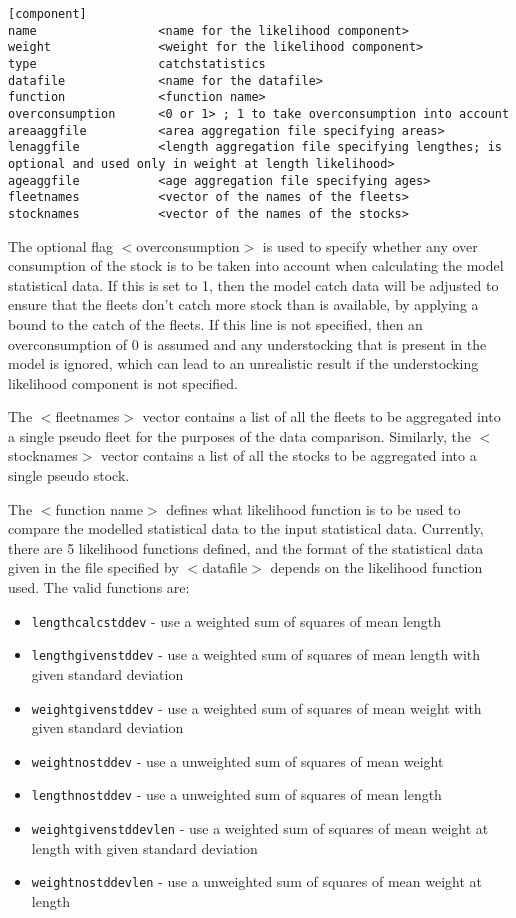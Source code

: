 \documentclass[]{book}
\providecommand{\tightlist}{%
  \setlength{\itemsep}{0pt}\setlength{\parskip}{0pt}}
\begin{document}
\begin{verbatim}
[component]
name                 <name for the likelihood component>
weight               <weight for the likelihood component>
type                 catchstatistics
datafile             <name for the datafile>
function             <function name>
overconsumption      <0 or 1> ; 1 to take overconsumption into account
areaaggfile          <area aggregation file specifying areas>
lenaggfile           <length aggregation file specifying lengthes; is optional and used only in weight at length likelihood>
ageaggfile           <age aggregation file specifying ages>
fleetnames           <vector of the names of the fleets>
stocknames           <vector of the names of the stocks>
\end{verbatim}

The optional flag \(<\)overconsumption\(>\) is used to specify whether any
over consumption of the stock is to be taken into account when
calculating the model statistical data. If this is set to 1, then the
model catch data will be adjusted to ensure that the fleets don't catch
more stock than is available, by applying a bound to the catch of the
fleets. If this line is not specified, then an overconsumption of 0 is
assumed and any understocking that is present in the model is ignored,
which can lead to an unrealistic result if the understocking likelihood
component is not specified.

The \(<\)fleetnames\(>\) vector contains a list of all the fleets to be
aggregated into a single pseudo fleet for the purposes of the data
comparison. Similarly, the \(<\)stocknames\(>\) vector contains a list of
all the stocks to be aggregated into a single pseudo stock.

The \(<\)function name\(>\) defines what likelihood function is to be used
to compare the modelled statistical data to the input statistical data.
Currently, there are 5 likelihood functions defined, and the format of
the statistical data given in the file specified by \(<\)datafile\(>\)
depends on the likelihood function used. The valid functions are:

\begin{itemize}
\tightlist
\item
  \texttt{lengthcalcstddev} - use a weighted sum of squares of mean length
\item
  \texttt{lengthgivenstddev} - use a weighted sum of squares of mean length with given standard deviation
\item
  \texttt{weightgivenstddev} - use a weighted sum of squares of mean weight with given standard deviation
\item
  \texttt{weightnostddev} - use a unweighted sum of squares of mean weight
\item
  \texttt{lengthnostddev} - use a unweighted sum of squares of mean length
\item
  \texttt{weightgivenstddevlen} - use a weighted sum of squares of mean weight at length with given standard deviation
\item
  \texttt{weightnostddevlen} - use a unweighted sum of squares of mean weight at length
\end{itemize}
\end{document}
